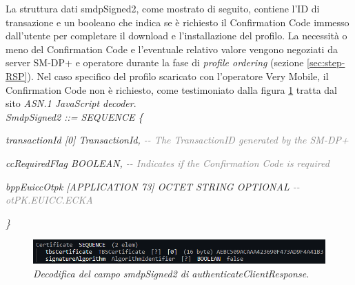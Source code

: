 \documentclass[10pt, oneside]{book}
\begin{document}
La struttura dati smdpSigned2, come mostrato di seguito, contiene l'ID di transazione e un booleano che indica se è richiesto il Confirmation Code immesso dall'utente per completare il download e l'installazione del profilo. La necessità o meno del Confirmation Code e l'eventuale relativo valore vengono negoziati da server SM-DP+ e operatore durante la fase di \textit{profile ordering} (sezione \ref{sec:step-RSP}). Nel caso specifico del profilo scaricato con l'operatore Very Mobile, il Confirmation Code non è richiesto, come testimoniato dalla figura \ref{fig:decode-smdpSigned2} tratta dal sito \textit{ASN.1 JavaScript decoder}.\\

\textit{SmdpSigned2 ::= SEQUENCE \{}

\hspace{0.75cm} \textit{transactionId [0] TransactionId, \textcolor{gray}{{-}{-} The TransactionID generated by the SM-DP+}}

\hspace{0.75cm} \textit{ccRequiredFlag BOOLEAN, \textcolor{gray}{{-}{-} Indicates if the Confirmation Code is required}}

\hspace{0.75cm} \textit{bppEuiccOtpk [APPLICATION 73] OCTET STRING OPTIONAL \textcolor{gray}{{-}{-} otPK.EUICC.ECKA}}

\textit{\}\\}

\begin{figure}
\includegraphics[width=\linewidth]{decode-smdpSigned2.png}
\caption{\textit{Decodifica del campo smdpSigned2 di authenticateClientResponse.}}
\label{fig:decode-smdpSigned2}
\end{figure}
\end{document}
